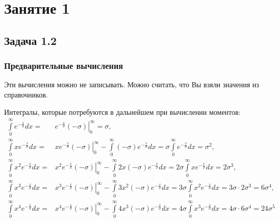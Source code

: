 \chapter{Занятие 1}

\section*{Задача 1.2}

\subsection*{Предварительные вычисления}

Эти вычисления можно не записывать. Можно считать, что Вы взяли значения из справочников.

Интегралы, которые потребуются в дальнейшем при вычислении моментов:
\begin{align}
    \int \limits_{0}^\infty e^{-\frac{x}{\sigma}} dx
    = & \left . e^{- \frac{x}{\sigma}} (- \sigma) \right |_0^{\infty}
    = \sigma , \\
    \int \limits_{0}^\infty x e^{-\frac{x}{\sigma}} dx
    = & \left . x e^{-\frac{x}{\sigma}} ( - \sigma ) \right |_0^{\infty} - \int \limits_{0}^\infty (- \sigma) e^{-\frac{x}{\sigma}} dx
    = \sigma \int \limits_{0}^\infty e^{-\frac{x}{\sigma}} dx
    = \sigma^2 , \\
    \int \limits_{0}^\infty x^2 e^{-\frac{x}{\sigma}} dx
    = & \left . x^2 e^{-\frac{x}{\sigma}} ( - \sigma ) \right |_0^{\infty} - \int \limits_{0}^\infty 2 x (- \sigma) e^{-\frac{x}{\sigma}} dx
    = 2 \sigma \int \limits_{0}^\infty x e^{-\frac{x}{\sigma}} dx
    = 2 \sigma^3 , \\
    \int \limits_{0}^\infty x^3 e^{-\frac{x}{\sigma}} dx
    = & \left . x^3 e^{-\frac{x}{\sigma}} ( - \sigma ) \right |_0^{\infty} - \int \limits_{0}^\infty 3 x^2 (- \sigma) e^{-\frac{x}{\sigma}} dx
    = 3 \sigma \int \limits_{0}^\infty x^2 e^{-\frac{x}{\sigma}} dx
    = 3 \sigma \cdot 2 \sigma^3 = 6 \sigma^4 , \\
    \int \limits_{0}^\infty x^4 e^{-\frac{x}{\sigma}} dx
    = & \left . x^4 e^{-\frac{x}{\sigma}} ( - \sigma ) \right |_0^{\infty} - \int \limits_{0}^\infty 4 x^3 (- \sigma) e^{-\frac{x}{\sigma}} dx
    = 4 \sigma \int \limits_{0}^\infty x^3 e^{-\frac{x}{\sigma}} dx
    = 4 \sigma \cdot 6 \sigma^4 = 24 \sigma^5
\end{align}

